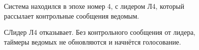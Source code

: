 \documentclass[pdf, 10pt, unicode,aspectratio=169]{beamer} %
\begin{document}
\begin{frame}
\begin{figure}[H]
\begin{minipage}[h]{0.49\linewidth}
\begin{small}
Система находился в эпохе номер 4, с лидером Л4, который рассылает контрольные сообщения ведомым.  \\
\end{small}
\end{minipage}
\hfill
\begin{minipage}[h]{0.49\linewidth}
\begin{small}
СЛидер Л4 отказывает. Без контрольного сообщения от лидера, таймеры ведомых не обновляются и начнётся голосование. \\
\end{small}
\end{minipage}
\end{figure}

\end{frame}
\end{document}
